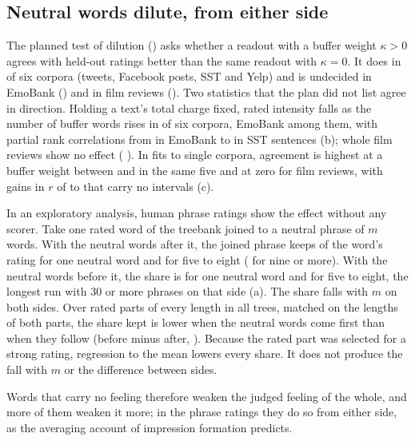 \subsection{Neutral words dilute, from either side}

The planned test of dilution () asks whether a readout with a buffer weight $\kappa>0$ agrees with held-out ratings better than the same readout with $\kappa=0$. It does in \winsNoDil{} of six corpora (tweets, Facebook posts, SST and Yelp) and is undecided in EmoBank (\dNoDilEmo) and in film reviews (\dNoDilFilm). Two statistics that the plan did not list agree in direction. Holding a text's total charge fixed, rated intensity falls as the number of buffer words rises in \partialNeg{} of six corpora, EmoBank among them, with partial rank correlations from \partialEmo{} in EmoBank to \partialSst{} in SST sentences (b); whole film reviews show no effect (\partialFilm{} \partialFilmCI). In fits to single corpora, agreement is highest at a buffer weight between \kappaLo{} and \kappaHi{} in the same five and at zero for film reviews, with gains in $r$ of \gainKappaLo{} to \gainKappaHi{} that carry no intervals (c).

In an exploratory analysis, human phrase ratings show the effect without any scorer. Take one rated word of the treebank joined to a neutral phrase of $m$ words. With the neutral words after it, the joined phrase keeps \ptKeptAfterFirst{} \ptKeptAfterFirstCI{} of the word's rating for one neutral word and \ptKeptAfterFive{} \ptKeptAfterFiveCI{} for five to eight (\ptKeptAfterLast{} \ptKeptAfterLastCI{} for nine or more). With the neutral words before it, the share is \ptKeptBeforeFirst{} \ptKeptBeforeFirstCI{} for one neutral word and \ptKeptBeforeLast{} \ptKeptBeforeLastCI{} for five to eight, the longest run with 30 or more phrases on that side (a). The share falls with $m$ on both sides. Over rated parts of every length in all trees, matched on the lengths of both parts, the share kept is lower when the neutral words come first than when they follow (before minus after, \ptDil{} \ptDilCI). Because the rated part was selected for a strong rating, regression to the mean lowers every share. It does not produce the fall with $m$ or the difference between sides.

Words that carry no feeling therefore weaken the judged feeling of the whole, and more of them weaken it more; in the phrase ratings they do so from either side, as the averaging account of impression formation predicts\cite{anderson1965,nisbett1981}.

